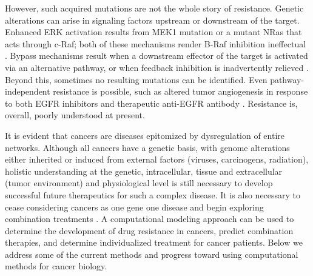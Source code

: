 \documentclass[12pt]{article}
\begin{document}
However, such acquired mutations are not the whole story of resistance. Genetic alterations can arise in signaling factors upstream or downstream of the target. Enhanced ERK activation results from MEK1 mutation or a mutant NRas that acts through c-Raf; both of these mechanisms render B-Raf inhibition ineffectual \cite{Garraway2012}. 
Bypass mechanisms result when a downstream effector of the target is activated via an alternative pathway, or when feedback inhibition is inadvertently relieved \cite{Garraway2012}. 
Beyond this, sometimes no resulting mutations can be identified. Even pathway-independent resistance is possible, such as altered tumor angiogenesis in response to both EGFR inhibitors and therapeutic anti-EGFR antibody \cite{Garraway2012}.
Resistance is, overall, poorly understood at present.

It is evident that cancers are diseases epitomized by dysregulation of entire networks.
Although all cancers have a genetic basis, with genome alterations either inherited or induced from external factors (viruses, carcinogens, radiation), holistic understanding at the genetic, intracellular, tissue and extracellular (tumor environment) and physiological level is still necessary to develop successful future therapeutics for such a complex disease. 
It is also necessary to cease considering cancers as one gene one disease and begin exploring combination treatments \cite{Ryall2015}. 
A computational modeling approach can be used to determine the development of drug resistance in cancers, predict combination therapies, and determine individualized treatment for cancer patients.
Below we address some of the current methods and progress toward using computational methods for cancer biology.

\end{document}
